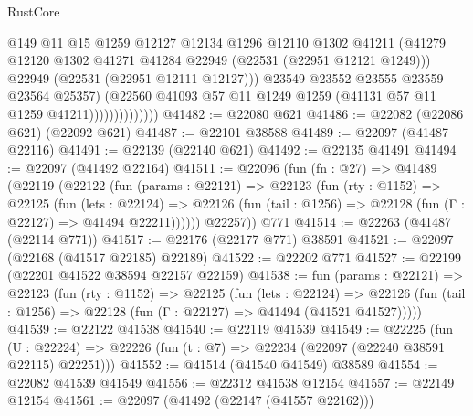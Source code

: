 \begin{lexlean}{RustCore}
\begin{coremodule}
                                @149
                                @11
                                @15
                                @1259
                                @12127
                                @12134
                                @1296
                                @12110
                                @1302
                                @41211
                                (@41279
                                  @12120
                                  @1302
                                  @41271
                                  @41284
                                  @22949
                                  (@22531 (@22951 @12121 @1249)))
                                @22949
                                (@22531 (@22951 @12111 @12127)))
                              @23549
                              @23552
                              @23555
                              @23559
                              @23564
                              @25357)
                            (@22560
                              @41093
                              @57
                              @11
                              @1249
                              @1259
                              (@41131 @57 @11 @1259 @41211))))))))))))))
@41482 := @22080 @621
@41486 := @22082 (@22086 @621) (@22092 @621)
@41487 := @22101 @38588
@41489 := @22097 (@41487 @22116)
@41491 := @22139 (@22140 @621)
@41492 := @22135 @41491
@41494 := @22097 (@41492 @22164)
@41511 := @22096
    (fun (fn : @27) =>
    @41489
      (@22119
        (@22122
          (fun (params : @22121) =>
          @22123
            (fun (rty : @1152) =>
            @22125
              (fun (lets : @22124) =>
              @22126 (fun (tail : @1256) => @22128 (fun (Γ : @22127) => @41494 @22211))))))
        @22257))
    @771
@41514 := @22263 (@41487 (@22114 @771))
@41517 := @22176 (@22177 @771) @38591
@41521 := @22097 (@22168 (@41517 @22185) @22189)
@41522 := @22202 @771
@41527 := @22199 (@22201 @41522 @38594 @22157 @22159)
@41538 := fun (params : @22121) =>
  @22123
    (fun (rty : @1152) =>
    @22125
      (fun (lets : @22124) =>
      @22126 (fun (tail : @1256) => @22128 (fun (Γ : @22127) => @41494 (@41521 @41527)))))
@41539 := @22122 @41538
@41540 := @22119 @41539
@41549 := @22225
    (fun (U : @22224) => @22226 (fun (t : @7) => @22234 (@22097 (@22240 @38591 @22115) @22251)))
@41552 := @41514 (@41540 @41549) @38589
@41554 := @22082 @41539 @41549
@41556 := @22312 @41538 @12154
@41557 := @22149 @12154
@41561 := @22097 (@41492 (@22147 (@41557 @22162)))

\end{coremodule}
\end{lexlean}
